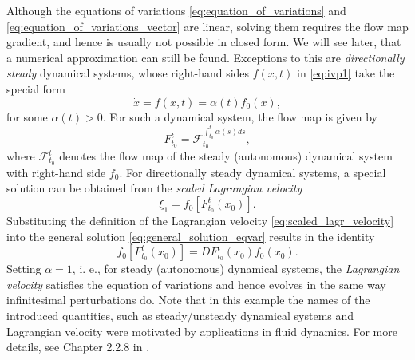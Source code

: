 \begin{ex}
Although the equations of variations \eqref{eq:equation_of_variations} and \eqref{eq:equation_of_variations_vector} are linear, solving them requires the flow map gradient, and hence is usually not possible in closed form. We will see later, that  a numerical approximation can still be found. Exceptions to this are {\em directionally steady} dynamical systems, whose right-hand sides $f(x,t)$ in \eqref{eq:ivp1} take the special form 
\begin{equation}
\dot{x} = f(x,t) = \alpha(t)f_0(x),
\end{equation}
for some $\alpha(t)>0$. For such a dynamical system, the flow map is given by 
\begin{equation}
F_{t_0}^t  = \mathcal{F}_{t_0}^{\int_{t_0}^t\alpha(s) ds},
\end{equation}
where $\mathcal{F}_{t_0}^t$ denotes the flow map of the steady (autonomous) dynamical system with right-hand side $f_0$. For directionally steady dynamical systems, a special solution can be obtained from the {\em scaled Lagrangian velocity} 
\begin{equation}
\label{eq:scaled_lagr_velocity}
\xi_1 = f_0\left[F_{t_0}^t(x_0)\right]. 
\end{equation}
Substituting the definition of the Lagrangian velocity \eqref{eq:scaled_lagr_velocity} into the general solution  \eqref{eq:general_solution_eqvar} results in the identity
\begin{equation}
\label{eq:lagrangian_velocity_solution}
f_0\left[F_{t_0}^t(x_0)\right] =  DF_{t_0}^{t}(x_0) f_0(x_0).
\end{equation}
Setting $\alpha = 1$, i. e., for steady (autonomous) dynamical systems, the {\em Lagrangian velocity} satisfies the equation of variations and hence evolves in the same way infinitesimal perturbations do. Note that in this example the names of the introduced quantities, such as steady/unsteady dynamical systems and Lagrangian velocity were motivated by applications in fluid dynamics. For more details, see Chapter 2.2.8 in \cite{Haller2023}. 
\end{ex}

